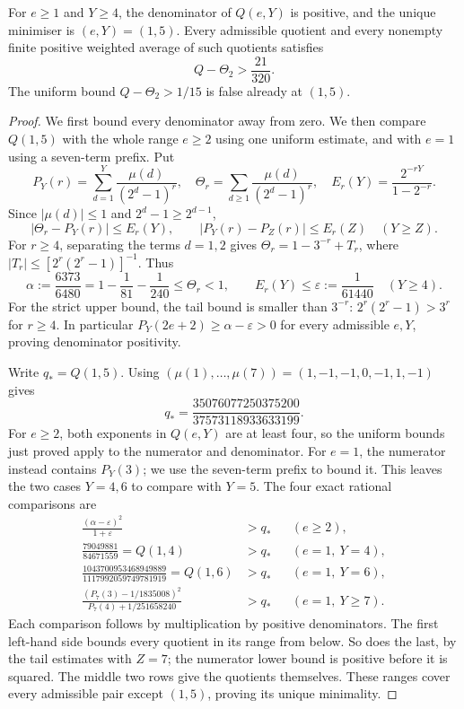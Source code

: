 \begin{theorem}\label{res:rankonefloor}
For $e\ge1$ and $Y\ge4$, the denominator of $Q(e,Y)$ is positive, and the
unique minimiser is $(e,Y)=(1,5)$. Every admissible quotient and every
nonempty finite positive weighted average of such quotients satisfies
\[
 Q-\Theta_2>\frac{21}{320}.
\]
The uniform bound $Q-\Theta_2>1/15$ is false already at $(1,5)$.
\end{theorem}
\begin{proof}
We first bound every denominator away from zero. We then compare
$Q(1,5)$ with the whole range $e\ge2$ using one uniform estimate,
and with $e=1$ using a seven-term prefix. Put
\[
 P_Y(r)=\sum_{d=1}^{Y}\frac{\mu(d)}{(2^d-1)^r},\quad
 \Theta_r=\sum_{d\ge1}\frac{\mu(d)}{(2^d-1)^r},\quad
 E_r(Y)=\frac{2^{-rY}}{1-2^{-r}}.
\]
Since $|\mu(d)|\le1$ and $2^d-1\ge2^{d-1}$,
\[
 |\Theta_r-P_Y(r)|\le E_r(Y),\qquad
 |P_Y(r)-P_Z(r)|\le E_r(Z)\quad(Y\ge Z).
\]
For $r\ge4$, separating the terms $d=1,2$ gives
$\Theta_r=1-3^{-r}+T_r$, where
$|T_r|\le[2^r(2^r-1)]^{-1}$. Thus
\[
 \alpha:=\frac{6373}{6480}=1-\frac1{81}-\frac1{240}
 \le\Theta_r<1,
 \qquad E_r(Y)\le\varepsilon:=\frac1{61440}\quad(Y\ge4).
\]
For the strict upper bound, the tail bound is smaller than $3^{-r}$:
$2^r(2^r-1)>3^r$ for $r\ge4$.
In particular $P_Y(2e+2)\ge\alpha-\varepsilon>0$ for every admissible
$e,Y$, proving denominator positivity.

Write $q_*=Q(1,5)$. Using
$(\mu(1),\ldots,\mu(7))=(1,-1,-1,0,-1,1,-1)$ gives
\[
 q_* = \frac{35076077250375200}{37573118933633199}.
\]
For $e\ge2$, both exponents in $Q(e,Y)$ are at least four, so the
uniform bounds just proved apply to the numerator and denominator.
For $e=1$, the numerator instead contains $P_Y(3)$; we use the
seven-term prefix to bound it. This leaves the two cases $Y=4,6$
to compare with $Y=5$. The four exact rational comparisons are
\begin{align*}
 \frac{(\alpha-\varepsilon)^2}{1+\varepsilon}&>q_*
       &&(e\ge2),\\
 \frac{79049881}{84671559}=Q(1,4)&>q_*
       &&(e=1,\ Y=4),\\
 \frac{1043700953468949889}{1117992059749781919}=Q(1,6)&>q_*
       &&(e=1,\ Y=6),\\
 \frac{(P_7(3)-1/1835008)^2}{P_7(4)+1/251658240}&>q_*
       &&(e=1,\ Y\ge7).
\end{align*}
Each comparison follows by multiplication by positive denominators.
The first left-hand side bounds every quotient in its range from
below. So does the last, by the tail estimates with $Z=7$; the
numerator lower bound is positive before it is squared. The middle
two rows give the quotients themselves. These ranges cover every
admissible pair except $(1,5)$, proving its unique minimality.


\end{proof}
